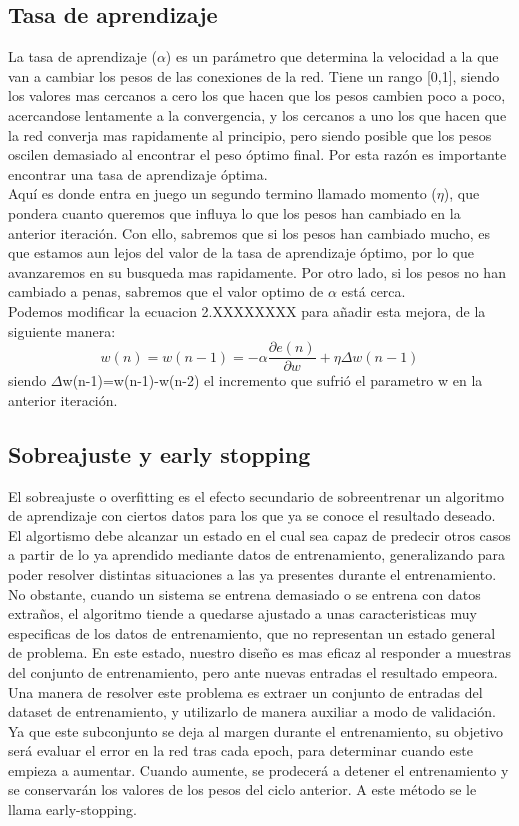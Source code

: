 \subsection{Tasa de aprendizaje}
La tasa de aprendizaje (${\alpha}$) es un parámetro que determina la velocidad a la que van a cambiar los pesos de las conexiones de la red. Tiene un rango [0,1], siendo los valores mas cercanos a cero los que hacen que los pesos cambien poco a poco, acercandose lentamente a la convergencia, y los cercanos a uno los que hacen que la red converja mas rapidamente al principio, pero siendo posible que los pesos oscilen demasiado al encontrar el peso óptimo final. Por esta razón es importante encontrar una tasa de aprendizaje óptima.\\
Aquí es donde entra en juego un segundo termino llamado momento (${\eta}$), que pondera cuanto queremos que influya lo que los pesos han cambiado en la anterior iteración. Con ello, sabremos que si los pesos han cambiado mucho, es que estamos aun lejos del valor de la tasa de aprendizaje óptimo, por lo que avanzaremos en su busqueda mas rapidamente. Por otro lado, si los pesos no han cambiado a penas, sabremos que el valor optimo de ${\alpha}$ está cerca.\\
Podemos modificar la ecuacion 2.XXXXXXXX para añadir esta mejora, de la siguiente manera:
\begin{equation}
w(n) = w(n-1) = - \alpha \frac{\partial e(n)}{\partial w} + \eta \Delta w(n-1)
\end{equation} 
siendo ${\Delta}$w(n-1)=w(n-1)-w(n-2) el incremento que sufrió el parametro w en la anterior iteración.
\subsection{Sobreajuste y early stopping}
El sobreajuste o overfitting es el efecto secundario de sobreentrenar un algoritmo de aprendizaje con ciertos datos para los que ya se conoce el resultado deseado. El algortismo debe alcanzar un estado en el cual sea capaz de predecir otros casos a partir de lo ya aprendido mediante datos de entrenamiento, generalizando para poder resolver distintas situaciones a las ya presentes durante el entrenamiento. No obstante, cuando un sistema se entrena demasiado o se entrena con datos extraños, el algoritmo tiende a quedarse ajustado a unas caracteristicas muy especificas de los datos de entrenamiento, que no representan un estado general de problema. En este estado, nuestro diseño es mas eficaz al responder a muestras del conjunto de entrenamiento, pero ante nuevas entradas el resultado empeora.\\
Una manera de resolver este problema es extraer un conjunto de entradas del dataset de entrenamiento, y utilizarlo de manera auxiliar a modo de validación. Ya que este subconjunto se deja al margen durante el entrenamiento, su objetivo será evaluar el error en la red tras cada epoch, para determinar cuando este empieza a aumentar. Cuando aumente, se prodecerá a detener el entrenamiento y se conservarán los valores de los pesos del ciclo anterior. A este método se le llama early-stopping.

